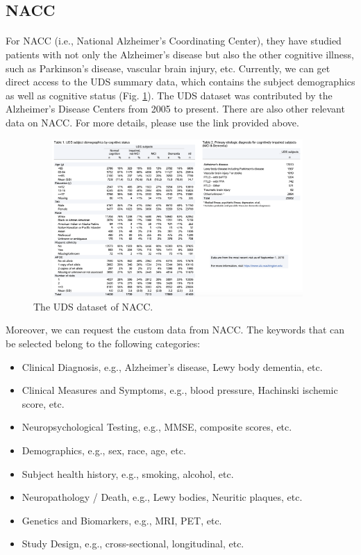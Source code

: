 \documentclass{article}
\begin{document}
\newpage
\subsection{NACC}
\paragraph{}
For NACC (i.e., National Alzheimer's Coordinating Center), they have studied patients with not only the Alzheimer's disease but also the other cognitive illness, such as Parkinson's disease, vascular brain injury, etc. Currently, we can get direct access to the UDS summary data, which contains the subject demographics as well as cognitive status (Fig. \ref{f:nacc}). The UDS dataset was contributed by the Alzheimer’s Disease Centers from 2005 to present. There are also other relevant data on NACC. For more details, please use the link provided above.

\begin{figure}[!hbt]
\centering
\includegraphics[width=11cm, height=6cm]{figs/nacc.png}
\caption{The UDS dataset of NACC.}
\label{f:nacc}
\end{figure}

Moreover, we can request the custom data from NACC. The keywords that can be selected belong to the following categories:

\begin{itemize}
  \item Clinical Diagnosis, e.g., Alzheimer's disease, Lewy body dementia, etc.
  \item Clinical Measures and Symptoms, e.g., blood pressure, Hachinski ischemic score, etc.
  \item Neuropsychological Testing, e.g., MMSE, composite scores, etc.
  \item Demographics, e.g., sex, race, age, etc.
  \item Subject health history, e.g., smoking, alcohol, etc.
  \item Neuropathology / Death, e.g., Lewy bodies, Neuritic plaques, etc.
  \item Genetics and Biomarkers, e.g., MRI, PET, etc.
  \item Study Design, e.g., cross-sectional, longitudinal, etc.
\end{itemize}
\end{document}
